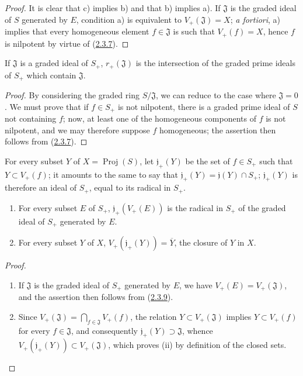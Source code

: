 \begin{proof}
It is clear that c) implies b) and that b) implies a). If $\mathfrak{J}$ is
the graded ideal of $S$ generated by $E$, condition a) is equivalent to
$V_+(\mathfrak{J})=X$; \emph{a fortiori}, a) implies that every homogeneous
element $f\in\mathfrak{J}$ is such that $V_+(f)=X$, hence $f$ is nilpotent
by virtue of (\hyperref[II.2.3.7]{2.3.7}).
\end{proof}

\begin{corollary}[2.3.9]
\label{II.2.3.9}
If $\mathfrak{J}$ is a graded ideal of $S_+$,
$r_+(\mathfrak{J})$ is the intersection of the graded prime ideals of
$S_+$ which contain $\mathfrak{J}$.
\end{corollary}

\begin{proof}
By considering the graded ring $S/\mathfrak{J}$, we can reduce to the case
where $\mathfrak{J}=0$. We must prove that if $f\in S_+$ is not
nilpotent, there is a graded prime ideal of $S$ not containing $f$; now,
at least one of the homogeneous components of $f$ is not nilpotent, and we
may therefore suppose $f$ homogeneous; the assertion then follows from
(\hyperref[II.2.3.7]{2.3.7}).
\end{proof}

\begin{env}[2.3.10]
\label{II.2.3.10}
For every subset $Y$ of $X=\operatorname{Proj}(S)$, let
$\mathfrak{j}_+(Y)$ be the set of $f\in S_+$ such that
$Y\subset V_+(f)$; it amounts to the same to say that
$\mathfrak{j}_+(Y)=\mathfrak{j}(Y)\cap S_+$; $\mathfrak{j}_+(Y)$ is
therefore an ideal of $S_+$, equal to its radical in $S_+$.
\end{env}

\begin{proposition}[2.3.11]
\label{II.2.3.11}
\begin{enumerate}
  \item[\rm(i)] For every subset $E$ of $S_+$,
    $\mathfrak{j}_+(V_+(E))$ is the radical in $S_+$ of the graded ideal of
    $S_+$ generated by $E$.
  \item[\rm(ii)] For every subset $Y$ of $X$,
    $V_+(\mathfrak{j}_+(Y))=\overline{Y}$, the closure of $Y$ in $X$.
\end{enumerate}
\end{proposition}

\begin{proof}
\begin{enumerate}
  \item[\rm(i)] If $\mathfrak{J}$ is the graded ideal of $S_+$ generated
    by $E$, we have $V_+(E)=V_+(\mathfrak{J})$, and the assertion then
    follows from (\hyperref[II.2.3.9]{2.3.9}).
  \item[\rm(ii)] Since
    $V_+(\mathfrak{J})=\bigcap_{f\in\mathfrak{J}}V_+(f)$, the relation
    $Y\subset V_+(\mathfrak{J})$ implies $Y\subset V_+(f)$ for every
    $f\in\mathfrak{J}$, and consequently
    $\mathfrak{j}_+(Y)\supset\mathfrak{J}$, whence
    $V_+(\mathfrak{j}_+(Y))\subset V_+(\mathfrak{J})$, which proves (ii)
    by definition of the closed sets.
\end{enumerate}
\end{proof}

